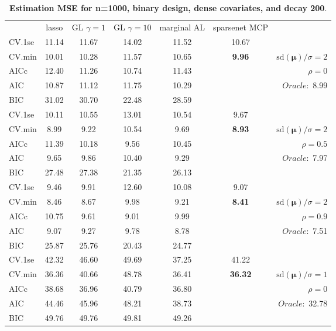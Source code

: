 \begin{table}\vspace{-.5cm}
\caption[l]{ { \bf Estimation MSE for n=1000, binary design, 
dense covariates, and  decay  200}.}
\vspace{-.5cm}
\footnotesize{}
\begin{center}
\begin{tabular}{l*{5}{c}|r}
& lasso & GL $\gamma=1$ & GL $\gamma=10$ & marginal AL & sparsenet MCP  & \\
 \cline{1-7}
CV.1se & 11.14 & 11.67 & 14.02 & 11.52 & 10.67 & \\
CV.min & 10.01 & 10.28 & 11.57 & 10.65 & {\bf 9.96} &  $\mathrm{sd}(\mathbf{\mu})/\sigma=2$ \\
AICc & 12.40 & 11.26 & 10.74 & 11.43 & & $\rho=0$ \\
AIC & 10.87 & 11.12 & 11.75 & 10.29 & &  \multirow{2}{*}{$Oracle: $ 8.99} \\
BIC & 31.02 & 30.70 & 22.48 & 28.59 & &  \\
 \hline 
CV.1se & 10.11 & 10.55 & 13.01 & 10.54 & 9.67 & \\
CV.min & 8.99 & 9.22 & 10.54 & 9.69 & {\bf 8.93} &  $\mathrm{sd}(\mathbf{\mu})/\sigma=2$ \\
AICc & 11.39 & 10.18 & 9.56 & 10.45 & & $\rho=0.5$ \\
AIC & 9.65 & 9.86 & 10.40 & 9.29 & &  \multirow{2}{*}{$Oracle: $ 7.97} \\
BIC & 27.48 & 27.38 & 21.35 & 26.13 & &  \\
 \hline 
CV.1se & 9.46 & 9.91 & 12.60 & 10.08 & 9.07 & \\
CV.min & 8.46 & 8.67 & 9.98 & 9.21 & {\bf 8.41} &  $\mathrm{sd}(\mathbf{\mu})/\sigma=2$ \\
AICc & 10.75 & 9.61 & 9.01 & 9.99 & & $\rho=0.9$ \\
AIC & 9.07 & 9.27 & 9.78 & 8.78 & &  \multirow{2}{*}{$Oracle: $ 7.51} \\
BIC & 25.87 & 25.76 & 20.43 & 24.77 & &  \\
 \hline 
CV.1se & 42.32 & 46.60 & 49.69 & 37.25 & 41.22 & \\
CV.min & 36.36 & 40.66 & 48.78 & 36.41 & {\bf 36.32} &  $\mathrm{sd}(\mathbf{\mu})/\sigma=1$ \\
AICc & 38.68 & 36.96 & 40.79 & 36.80 & & $\rho=0$ \\
AIC & 44.46 & 45.96 & 48.21 & 38.73 & &  \multirow{2}{*}{$Oracle: $ 32.78} \\
BIC & 49.76 & 49.76 & 49.81 & 49.26 & &  \\

\end{tabular}
\end{center}
\end{table}
